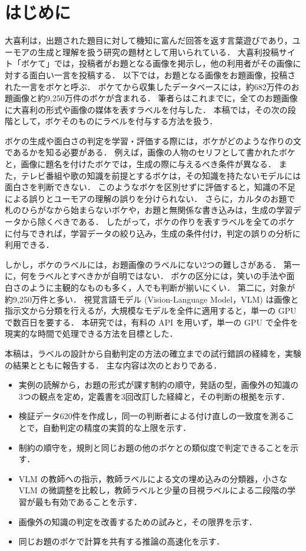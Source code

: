 \section{はじめに}
\label{sec_intro}
大喜利は，出題された題目に対して機知に富んだ回答を返す言葉遊びであり，ユーモアの生成と理解を扱う研究の題材として用いられている\cite{ref_oogiri_go, ref_newyorker}．
大喜利投稿サイト「ボケて」\cite{ref_bokete}では，投稿者がお題となる画像を掲示し，他の利用者がその画像に対する面白い一言を投稿する．
以下では，お題となる画像をお題画像，投稿された一言をボケと呼ぶ．
ボケてから収集したデータベースには，約682万件のお題画像と約9,250万件のボケが含まれる．
筆者らはこれまでに，全てのお題画像に大喜利の形式や画像の媒体を表すラベルを付与した．
本稿では，その次の段階として，ボケそのものにラベルを付与する方法を扱う．

ボケの生成や面白さの判定を学習・評価する際には，ボケがどのような作りの文であるかを知る必要がある．
例えば，画像の人物のセリフとして書かれたボケと，画像に題名を付けたボケでは，生成の際に与えるべき条件が異なる．
また，テレビ番組や歌の知識を前提とするボケは，その知識を持たないモデルには面白さを判断できない．
このようなボケを区別せずに評価すると，知識の不足による誤りとユーモアの理解の誤りを分けられない．
さらに，カルタのお題で札のひらがなから始まらないボケや，お題と無関係な書き込みは，生成の学習データから除くべきである．
したがって，ボケの作りを表すラベルを全てのボケに付与できれば，学習データの絞り込み，生成の条件付け，判定の誤りの分析に利用できる．

しかし，ボケのラベルには，お題画像のラベルにない2つの難しさがある．
第一に，何をラベルとすべきかが自明ではない．
ボケの区分には，笑いの手法や面白さのように主観的なものも多く，人でも判断が揃いにくい．
第二に，対象が約9,250万件と多い．
視覚言語モデル (Vision-Language Model，VLM) は画像と指示文から分類を行えるが，大規模なモデルを全件に適用すると，単一の GPU で数百日を要する．
本研究では，有料の API を用いず，単一の GPU で全件を現実的な時間で処理できる方法を目標とした．

本稿は，ラベルの設計から自動判定の方法の確立までの試行錯誤の経緯を，実験の結果とともに報告する．
主な内容は次のとおりである．
\begin{itemize}
    \item 実例の読解から，お題の形式が課す制約の順守，発話の型，画像外の知識の3つの観点を定め，定義書を3回改訂した経緯と，その判断の根拠を示す．
    \item 検証データ620件を作成し，同一の判断者による付け直しの一致度を測ることで，自動判定の精度の実質的な上限を示す．
    \item 制約の順守を，規則と同じお題の他のボケとの類似度で判定できることを示す．
    \item VLM の教師への指示，教師ラベルによる文の埋め込みの分類器，小さな VLM の微調整を比較し，教師ラベルと少量の目視ラベルによる二段階の学習が最も有効であることを示す．
    \item 画像外の知識の判定を改善するための試みと，その限界を示す．
    \item 同じお題のボケで計算を共有する推論の高速化を示す．
\end{itemize}

